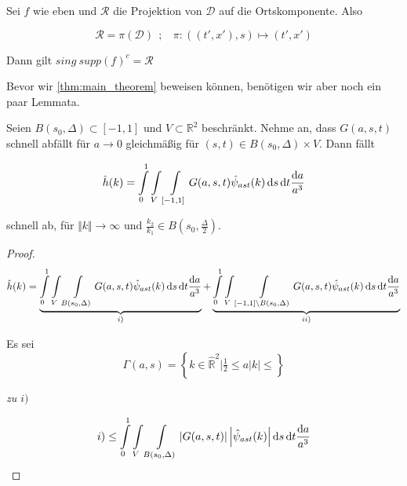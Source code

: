 \begin{corollary}
Sei $f$ wie eben und $\mathcal{R}$ die Projektion von $\mathcal{D}$ auf die  Ortskomponente. Also

\begin{equation}
    \mathcal{R} = \pi (\mathcal{D})~~;~~~~
    \pi : ((t',x'),s) \mapsto (t',x')
\end{equation}

Dann gilt $sing ~supp (f)^c = \mathcal{R}$
\end{corollary}

Bevor wir \cref{thm:main_theorem} beweisen können, benötigen wir aber noch ein paar Lemmata.

\begin{lemma}
Seien $ B(s_0,\Delta)\subset [-1,1]$ und $V \subset \mathbb{R}^2$ beschränkt. Nehme an, dass $G(a,s,t)$ schnell abfällt für $a \to 0$ gleichmäßig für $(s,t) \in  B(s_0,\Delta) \times V$. Dann fällt

\begin{equation*}
    \hat h(k) = \int \limits_0^1 \int \limits_V \int \limits_{[-1,1]}
    G(a,s,t) \hat \psi_{ast} (k)
        \mathop{}\!\mathrm{d} s \mathop{}\!\mathrm{d} t \frac{\mathop{}\!\mathrm{d} a}{a^3}
\end{equation*}

schnell ab, für $\Vert k \Vert \to \infty$ und $\frac{k_2}{k_1} \in B\left(s_0, \frac{\Delta}{2}\right)$.
\end{lemma}

\begin{proof}
\begin{dmath*}
    \hat h(k) =
    \underbrace{
    \int \limits_0^1 \int \limits_V \int \limits_{B(s_0,\Delta)}
    G(a,s,t) \hat \psi_{ast} (k)
        \d s \d t \frac{\d a}{a^3}}_{i)}
     +
    \underbrace{
     \int \limits_0^1 \int \limits_V \int \limits_{[-1,1]\setminus B(s_0,\Delta) }
    G(a,s,t) \hat \psi_{ast} (k)
        \d s \d t \frac{\d a}{a^3}}_{ii)}
\end{dmath*}

Es sei
\begin{equation*}
    \Gamma (a,s) = \left\{k \in \hat{\mathbb{R}}^2 \big| \tfrac{1}{2} \leq a|k| \leq
                   \right\}
\end{equation*}

\emph{zu $i)$}

\begin{dmath*}
    i) \leq \int \limits_0^1 \int \limits_V \int \limits_{B(s_0,\Delta)}
    \left\lvert G(a,s,t)\right\rvert
    \left\lvert \hat \psi_{ast} (k) \right\rvert
        \d s \d t \frac{\d a}{a^3}
\end{dmath*}
\end{proof}

